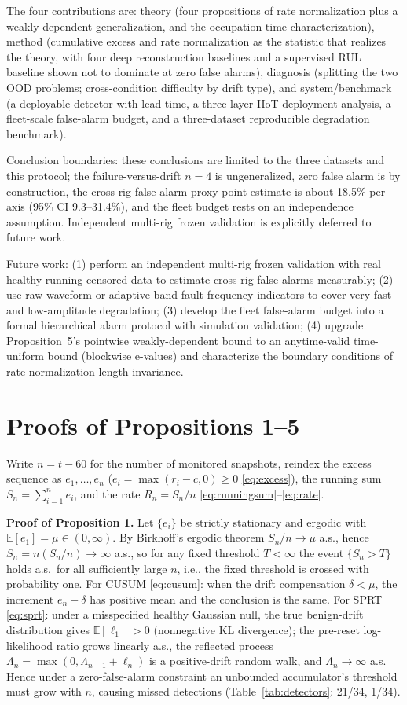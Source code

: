 \documentclass[journal]{IEEEtran}
\newcommand{\E}{\mathbb{E}}
\begin{document}
The four contributions are: theory (four propositions of rate normalization plus a weakly-dependent generalization, and the occupation-time characterization), method (cumulative excess and rate normalization as the statistic that realizes the theory, with four deep reconstruction baselines and a supervised RUL baseline shown not to dominate at zero false alarms), diagnosis (splitting the two OOD problems; cross-condition difficulty by drift type), and system/benchmark (a deployable detector with lead time, a three-layer IIoT deployment analysis, a fleet-scale false-alarm budget, and a three-dataset reproducible degradation benchmark).

Conclusion boundaries: these conclusions are limited to the three datasets and this protocol; the failure-versus-drift $n=4$ is ungeneralized, zero false alarm is by construction, the cross-rig false-alarm proxy point estimate is about 18.5\% per axis (95\% CI 9.3--31.4\%), and the fleet budget rests on an independence assumption. Independent multi-rig frozen validation is explicitly deferred to future work.

Future work: (1) perform an independent multi-rig frozen validation with real healthy-running censored data to estimate cross-rig false alarms measurably; (2) use raw-waveform or adaptive-band fault-frequency indicators to cover very-fast and low-amplitude degradation; (3) develop the fleet false-alarm budget into a formal hierarchical alarm protocol with simulation validation; (4) upgrade Proposition~5's pointwise weakly-dependent bound to an anytime-valid time-uniform bound (blockwise e-values) and characterize the boundary conditions of rate-normalization length invariance.

\appendix
\section{Proofs of Propositions 1--5}\label{app:proof}
Write $n=t-60$ for the number of monitored snapshots, reindex the excess sequence as $e_1,\dots,e_n$ ($e_i=\max(r_i-c,0)\ge0$ \eqref{eq:excess}), the running sum $S_n=\sum_{i=1}^{n}e_i$, and the rate $R_n=S_n/n$ \eqref{eq:runningsum}--\eqref{eq:rate}.

\textbf{Proof of Proposition 1.} Let $\{e_i\}$ be strictly stationary and ergodic with $\E[e_1]=\mu\in(0,\infty)$. By Birkhoff's ergodic theorem $S_n/n\to\mu$ a.s., hence $S_n=n(S_n/n)\to\infty$ a.s., so for any fixed threshold $T<\infty$ the event $\{S_n>T\}$ holds a.s.\ for all sufficiently large $n$, i.e., the fixed threshold is crossed with probability one. For CUSUM \eqref{eq:cusum}: when the drift compensation $\delta<\mu$, the increment $e_n-\delta$ has positive mean and the conclusion is the same. For SPRT \eqref{eq:sprt}: under a misspecified healthy Gaussian null, the true benign-drift distribution gives $\E[\ell_1]>0$ (nonnegative KL divergence); the pre-reset log-likelihood ratio grows linearly a.s., the reflected process $\Lambda_n=\max(0,\Lambda_{n-1}+\ell_n)$ is a positive-drift random walk, and $\Lambda_n\to\infty$ a.s. Hence under a zero-false-alarm constraint an unbounded accumulator's threshold must grow with $n$, causing missed detections (Table~\ref{tab:detectors}: 21/34, 1/34).
\end{document}
